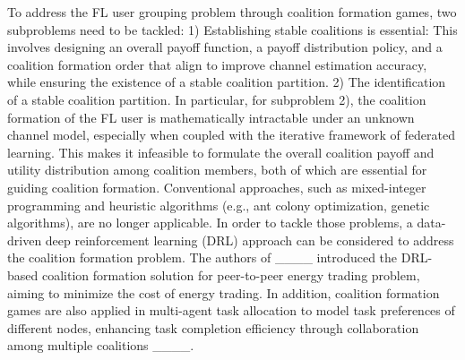 To address the FL user grouping problem through coalition formation games, two subproblems need to be tackled: 1) Establishing   stable coalitions  is essential: This involves  designing an overall payoff function, a payoff distribution policy, and a coalition formation order that align to improve channel estimation accuracy, while ensuring the existence of a stable coalition partition. 2) The identification of a stable coalition partition. 
In particular, for subproblem 2),  the coalition formation of the FL user 
is mathematically intractable  under an unknown channel model, especially when coupled with the iterative framework of federated learning. This makes it infeasible to formulate the overall coalition payoff  and utility   distribution among coalition members, both of which are essential for guiding coalition formation. 
Conventional   approaches, such as mixed-integer programming and heuristic algorithms (e.g., ant colony optimization, genetic algorithms), are no longer applicable.  In order to tackle those problems, a data-driven deep reinforcement learning (DRL) approach can be considered to address the coalition formation problem. 
The authors of ____ introduced the DRL-based coalition formation solution for peer-to-peer energy trading problem, aiming to minimize the cost of energy trading. In addition, coalition formation games are also applied in multi-agent task allocation to model task preferences of different nodes, enhancing task completion efficiency through collaboration among multiple coalitions ____. 



\vspace{-1.2em}